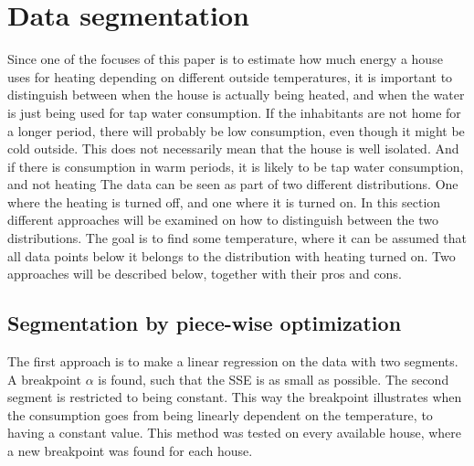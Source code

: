 \section{Data segmentation}
Since one of the focuses of this paper is to estimate how much energy a house uses for heating
depending on different outside temperatures, it is important to distinguish between when the house
is actually being heated, and when the water is just being used for tap water consumption. If the
inhabitants are not home for a longer period, there will probably be low consumption, even though
it might be cold outside. This does not necessarily mean that the house is well isolated. And if
there is consumption in warm periods, it is likely to be tap water consumption, and not heating
The data can be seen as part of two different distributions. One where the heating is turned off,
 and one where it is turned on. In this section different approaches will be examined on how to
 distinguish between the two distributions.
The goal is to find some temperature, where it can be assumed that all data points below it belongs
to the distribution with heating turned on. Two approaches will be described below, together with
their pros and cons.

\subsection{Segmentation by piece-wise optimization}
The first approach is to make a linear regression on the data with two segments. A breakpoint
$\alpha$ is found, such that the SSE is as small as possible. The second segment is restricted to
being constant. This way the breakpoint illustrates when the consumption goes from being linearly
dependent on the temperature, to having a constant value. This method was tested on every available
house, where a new breakpoint was found for each house.

